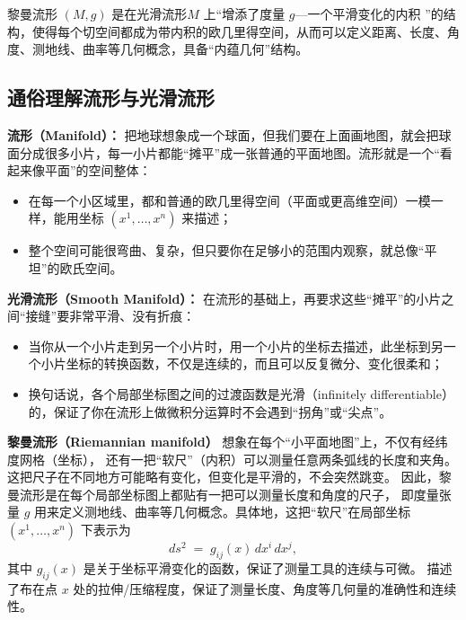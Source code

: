 黎曼流形 $(M,g)$ 是在光滑流形\(M\) 上“增添了度量 \(g\)---一个平滑变化的内积 ”的结构，使得每个切空间都成为带内积的欧几里得空间，从而可以定义距离、长度、角度、测地线、曲率等几何概念，具备“内蕴几何”结构。

\subsection*{通俗理解流形与光滑流形}

\textbf{流形（Manifold）：}  
把地球想象成一个球面，但我们要在上面画地图，就会把球面分成很多小片，每一小片都能“摊平”成一张普通的平面地图。流形就是一个“看起来像平面”的空间整体：  
\begin{itemize}
  \item 在每一个小区域里，都和普通的欧几里得空间（平面或更高维空间）一模一样，能用坐标 $(x^1,\dots,x^n)$ 来描述；  
  \item 整个空间可能很弯曲、复杂，但只要你在足够小的范围内观察，就总像“平坦”的欧氏空间。  
\end{itemize}

\textbf{光滑流形（Smooth Manifold）：}  
在流形的基础上，再要求这些“摊平”的小片之间“接缝”要非常平滑、没有折痕：  
\begin{itemize}
  \item 当你从一个小片走到另一个小片时，用一个小片的坐标去描述，此坐标到另一个小片坐标的转换函数，不仅是连续的，而且可以反复微分、变化很柔和；  
  \item 换句话说，各个局部坐标图之间的过渡函数是光滑（infinitely differentiable）的，保证了你在流形上做微积分运算时不会遇到“拐角”或“尖点”。  
\end{itemize}

\textbf{黎曼流形（Riemannian manifold）}  
想象在每个“小平面地图”上，不仅有经纬度网格（坐标），  
还有一把“软尺”（内积）可以测量任意两条弧线的长度和夹角。  
这把尺子在不同地方可能略有变化，但变化是平滑的，不会突然跳变。  
因此，黎曼流形是在每个局部坐标图上都贴有一把可以测量长度和角度的尺子， 即度量张量 $g$
用来定义测地线、曲率等几何概念。具体地，这把“软尺”在局部坐标  $(x^1,\dots,x^n)$ 下表示为  
$$
ds^2 \;=\; g_{ij}(x)\,dx^i\,dx^j,
$$
其中 $g_{ij}(x)$ 是关于坐标平滑变化的函数，保证了测量工具的连续与可微。
描述了布在点 $x$ 处的拉伸/压缩程度，保证了测量长度、角度等几何量的准确性和连续性。

